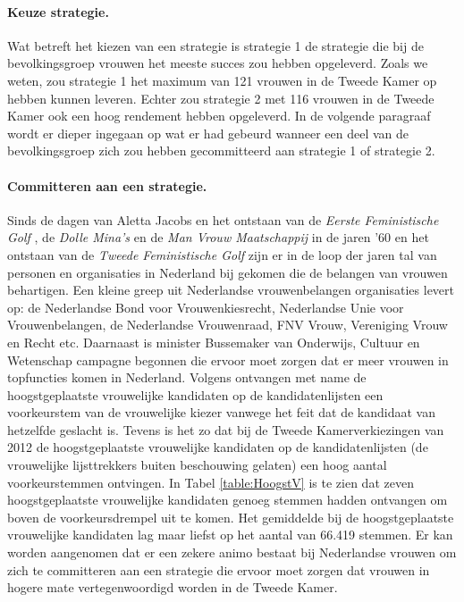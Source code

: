 \paragraph{Keuze strategie.}
Wat betreft het kiezen van een strategie is strategie 1 de strategie die bij de bevolkingsgroep vrouwen het meeste succes zou hebben opgeleverd. Zoals we weten, zou strategie 1 het maximum van 121 vrouwen in de Tweede Kamer op hebben kunnen leveren. Echter zou strategie 2 met 116 vrouwen in de Tweede Kamer ook een hoog rendement hebben opgeleverd. In de volgende paragraaf wordt er dieper ingegaan op wat er had gebeurd wanneer een deel van de bevolkingsgroep zich zou hebben gecommitteerd aan strategie 1 of strategie 2.

\paragraph{Committeren aan een strategie.}
Sinds de dagen van Aletta Jacobs en het ontstaan van de \textit{Eerste Feministische Golf} \citep{braun1992prijs}, de \textit{Dolle Mina's} en de \textit{Man Vrouw Maatschappij} in de jaren '60 en het ontstaan van de \textit{Tweede Feministische Golf} \citep{van2005vrouw} zijn er in de loop der jaren tal van personen en organisaties in Nederland bij gekomen die de belangen van vrouwen behartigen. Een kleine greep uit Nederlandse vrouwenbelangen organisaties levert op: de Nederlandse Bond voor Vrouwenkiesrecht, Nederlandse Unie voor Vrouwenbelangen, de Nederlandse Vrouwenraad, FNV Vrouw, Vereniging Vrouw en Recht etc. Daarnaast is minister Bussemaker van Onderwijs, Cultuur en Wetenschap \citeyearpar{navigerennaardetop} campagne begonnen die ervoor moet zorgen dat er meer vrouwen in topfuncties komen in Nederland. Volgens \cite{van2012tweede} ontvangen met name de hoogstgeplaatste vrouwelijke kandidaten op de kandidatenlijsten een voorkeurstem van de vrouwelijke kiezer vanwege het feit dat de kandidaat van hetzelfde geslacht is. Tevens is het zo dat bij de Tweede Kamerverkiezingen van 2012 \citep{Kiesraad_uitslag} de hoogstgeplaatste vrouwelijke kandidaten op de kandidatenlijsten (de vrouwelijke lijsttrekkers buiten beschouwing gelaten) een hoog aantal voorkeurstemmen ontvingen. In Tabel \ref{table:HoogstV} is te zien dat zeven hoogstgeplaatste vrouwelijke kandidaten genoeg stemmen hadden ontvangen om boven de voorkeursdrempel uit te komen. Het gemiddelde bij de hoogstgeplaatste vrouwelijke kandidaten lag maar liefst op het aantal van 66.419 stemmen. Er kan worden aangenomen dat er een zekere animo bestaat bij Nederlandse vrouwen om zich te committeren aan een strategie die ervoor moet zorgen dat vrouwen in hogere mate vertegenwoordigd worden in de Tweede Kamer. 


